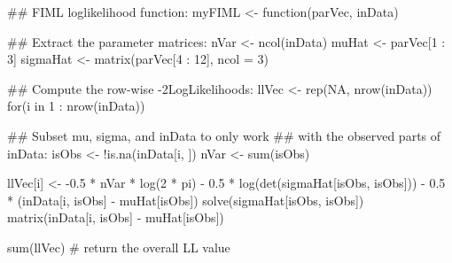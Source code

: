 \begin{Schunk}
\begin{Sinput}
 ## FIML loglikelihood function:
 myFIML <- function(parVec, inData)
 {
     ## Extract the parameter matrices:
     nVar <- ncol(inData)
     muHat <- parVec[1 : 3]
     sigmaHat <- matrix(parVec[4 : 12], ncol = 3)
 
     ## Compute the row-wise -2LogLikelihoods:
     llVec <- rep(NA, nrow(inData))
     for(i in 1 : nrow(inData)) {
         ## Subset mu, sigma, and inData to only work
         ## with the observed parts of inData:
         isObs <- !is.na(inData[i, ])
         nVar <- sum(isObs)
 
         llVec[i] <- -0.5 * nVar * log(2 * pi) -
             0.5 * log(det(sigmaHat[isObs, isObs])) -
                 0.5 * (inData[i, isObs] - muHat[isObs]) %*%
                     solve(sigmaHat[isObs, isObs]) %*%
                         matrix(inData[i, isObs] - muHat[isObs])
     }
     sum(llVec) # return the overall LL value
 }
\end{Sinput}
\end{Schunk}

